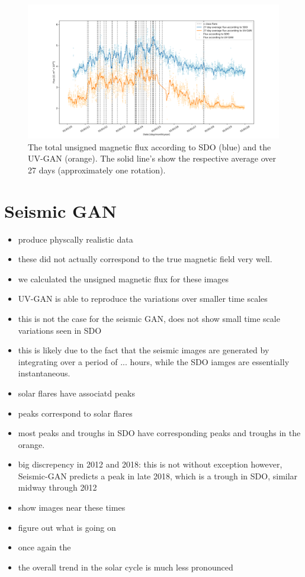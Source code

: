 \documentclass[11pt,a4paper,onecolumn]{report}
\begin{document}
\begin{figure}[h]
  \centering
  \includegraphics[width=\linewidth]{Flux_SDO_UV-GAN_average.png}

  \caption{The total unsigned magnetic flux according
  to SDO (blue) and the UV-GAN (orange). The solid line's show the respective
  average over 27 days (approximately one rotation).}
  \label{fig:flux_sdo_uv}
\end{figure}

\section{Seismic GAN}

\begin{itemize}
  \item produce physcally realistic data
  \item these did not actually correspond to the true magnetic field very well.
  \item we calculated the unsigned magnetic flux for these images
  
  \item UV-GAN is able to reproduce the variations over smaller time scales
  \item this is not the case for the seismic GAN, does not show small time scale
  variations seen in SDO
  \item this is likely due to the fact that the seismic images are generated by
  integrating over a period of ... hours, while the SDO iamges are essentially
  instantaneous.

  \item solar flares have associatd peaks
  \item peaks correspond to solar flares
  \item most peaks and troughs in SDO have corresponding peaks and troughs in
  the orange. 
  \item big discrepency in 2012 and 2018:
  this is not without exception however, Seismic-GAN predicts a peak in
  late 2018, which is a trough in SDO, similar midway through 2012
  \item show images near these times 
  \item figure out what is going on
  \item once again the 
  \item the overall trend in the solar cycle is much less pronounced

\end{itemize}
\end{document}
